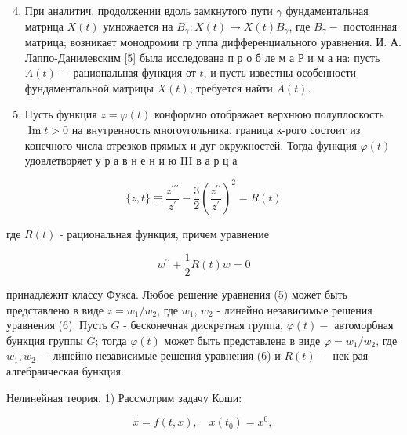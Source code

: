 \documentclass[10pt]{article}
\begin{document}
\begin{enumerate}

  \setcounter{enumi}{3}

  \item При аналитич. продолжении вдоль замкнутого пути $\gamma$ фундаментальная матрица $X(t)$ умножается на $B_{\gamma}: X(t) \rightarrow X(t) B_{\gamma}$, где $B_{\gamma}-$ постоянная матрица; возникает монодромии гр уппа дифференциального уравнения. И. А. Лаппо-Данилевским [5] была исследована п р о б ле м а Р и м а на: пусть $A(t)-$ рациональная функция от $t$, и пусть известны особенности фундаментальной матрицы $X(t)$; требуется найти $A(t)$.



  \item Пусть функция $z=\varphi(t)$ конформно отображает верхнюю полуплоскость $\operatorname{Im} t>0$ на внутренность многоугольника, граница к-рого состоит из конечного числа отрезков прямых и дуг окружностей. Тогда функция $\varphi(t)$ удовлетворяет у р а в н е н и ю III в а р ц а



\end{enumerate}



\[

\{z, t\} \equiv \frac{z^{\prime \prime \prime}}{z^{\prime}}-\frac{3}{2}\left(\frac{z^{\prime \prime}}{z^{\prime}}\right)^{2}=R(t)

\]



где $R(t)$ - рациональная функция, причем уравнение



\[

w^{\prime \prime}+\frac{1}{2} R(t) w=0

\]



принадлежит классу Фукса. Любое решение уравнения (5) может быть представлено в виде $z=w_{1} / w_{2}$, где $w_{1}$, $w_{2}$ - линейно независимые решения уравнения (6). Пусть $G$ - бесконечная дискретная группа, $\varphi(t)-$ автоморбная бункция группы $G$; тогда $\varphi(t)$ может быть представлена в виде $\varphi=w_{1} / w_{2}$, где $w_{1}, w_{2}-$ линейно независимые решения уравнения (6) и $R(t)-$ нек-рая алгебраическая бункция.



Нелинейная теория. 1) Рассмотрим задачу Коши:



\[

\dot{x}=f(t, x), \quad x\left(t_{0}\right)=x^{0} \text {, }

\]
\end{document}
